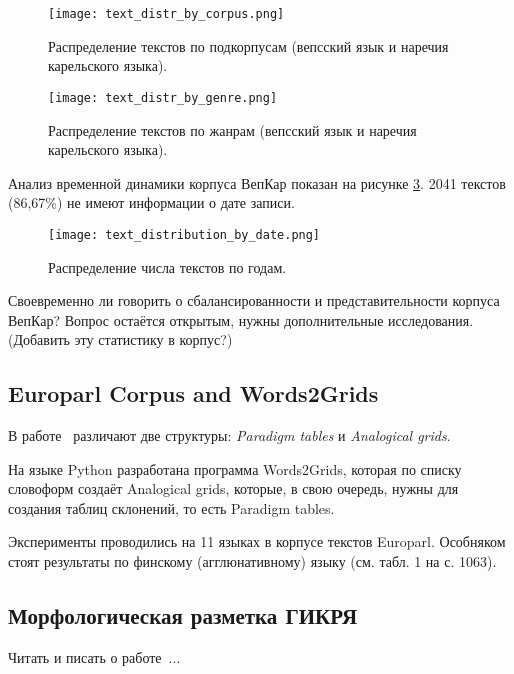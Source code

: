 \begin{figure}
    \centering
    \texttt{[image: text\_distr\_by\_corpus.png]}
    \caption{Распределение текстов по подкорпусам (вепсский язык и наречия карельского языка).}
    \label{fig:text_distr_by_corpus}
\end{figure}

\begin{figure}
    \centering
    \texttt{[image: text\_distr\_by\_genre.png]}
    \caption{Распределение текстов по жанрам (вепсский язык и наречия карельского языка).}
    \label{fig:text_distr_by_genre}
\end{figure}

Анализ временной динамики корпуса ВепКар показан на рисунке \ref{fig:text_distribution_by_date}. 2041 текстов (86,67\%) не имеют информации о дате записи.
\begin{figure}
    \centering
    \texttt{[image: text\_distribution\_by\_date.png]}
    \caption{Распределение числа текстов по годам.}
    \label{fig:text_distribution_by_date}
\end{figure}




Своевременно ли говорить о сбалансированности и представительности корпуса ВепКар? Вопрос остаётся открытым, нужны дополнительные исследования.
(Добавить эту статистику в корпус?)



\subsection{Europarl Corpus and Words2Grids}

В работе~\cite{Fam2018tools} различают две структуры: \emph{Paradigm tables} 
и \emph{Analogical grids}. 

На языке Python разработана программа Words2Grids, которая по списку словоформ 
создаёт Analogical grids, которые, в свою очередь, нужны для создания 
таблиц склонений, то есть Paradigm tables.

Эксперименты проводились на 11 языках в корпусе текстов Europarl. 
Особняком стоят результаты по финскому (агглюнативному) языку (см. табл. 1 на с. 1063).


\subsection{Морфологическая разметка ГИКРЯ}

Читать и писать о работе~\cite{Selegey2016}...
